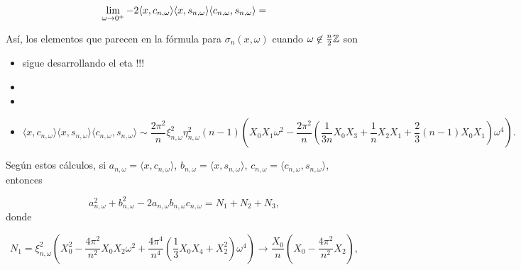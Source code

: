 \begin{equation}
\label{ec: limite -2abc}
\lim\limits_{\omega \rightarrow 0^{+}}{
-2 \langle x, c_{n, \omega} \rangle
\langle x, s_{n, \omega} \rangle
\langle c_{n, \omega}, s_{n, \omega} \rangle
= 
}
\end{equation}

Así, los elementos que parecen en la fórmula
para $\sigma_{n}(x, \omega)$ cuando $\omega \not\in \frac{n}{2} \mathbb{Z}$ son
\begin{itemize}
\item 
{}
sigue desarrollando el eta  !!!
\item
\TODO{
\[
\langle x,
c_{n, \omega}
\rangle^{2} = 
\xi_{n, \omega}^{2}
\left(
X_{0}^{2} - \frac{4 \pi^{2}}{n^{2}}X_{0}X_{2} \omega^{2} 
+ 
\frac{4 \pi^{4}}{n^{4}}
\left(
\frac{1}{3} X_{0}X_{4} + X_{2}^{2}
\right) \omega^{4} 
+ o(\omega^{5})
\right)
\]
}

\item
\TODO{
\[
\langle x,
s_{n, \omega}
\rangle^{2} = 
\frac{4 \pi^{2}}{n^{2}}
\eta_{n, \omega}^{2}
\left(
X_{1}^{2}\omega^{2} - \frac{4 \pi^{2}}{3n^{2}}X_{1}X_{3} \omega^{4} 
+  o(\omega^{5})
\right)
\]
}

\item
\[
\langle
x, c_{n, \omega}
\rangle
\langle
x, s_{n, \omega}
\rangle
\langle
c_{n, \omega}, s_{n, \omega}
\rangle \sim
\frac{2 \pi^{2}}{n}
\xi_{n, \omega}^{2} \eta_{n, \omega}^{2}(n-1)
\left(
X_{0}X_{1}\omega^{2} 
- \frac{2 \pi^{2}}{n}
\left(
\frac{1}{3n} X_{0}X_{3} + \frac{1}{n} X_{2}X_{1}
+ \frac{2}{3}(n-1)X_{0}X_{1}
\right) \omega^{4}
\right).
\]
\end{itemize}

Según estos cálculos, si
$a_{n, \omega} = \langle x, c_{n, \omega} \rangle$, 
$b_{n, \omega} = \langle x, s_{n, \omega} \rangle$, 
$c_{n, \omega} = \langle c_{n, \omega}, s_{n, \omega} \rangle$, 
entonces

\[
a_{n, \omega}^{2} + b_{n, \omega}^{2} - 
2a_{n, \omega}b_{n, \omega}c_{n, \omega}
= N_{1} + N_{2} +N_{3},
\]
donde

\[
N_{1} =
\xi_{n, \omega}^{2} \left(
X_{0}^{2} - \frac{4\pi^{2}}{n^{2}} X_{0}X_{2}
\omega^{2} + \frac{4 \pi^{4}}{n^{4}}
\left(
\frac{1}{3} X_{0}X_{4} + X_{2}^{2}
\right) \omega^{4}
\right)
\rightarrow 
\frac{X_{0}}{n}
\left(
X_{0}  - \frac{4 \pi^{2}}{n^{2}}X_{2}
\right),
\]

